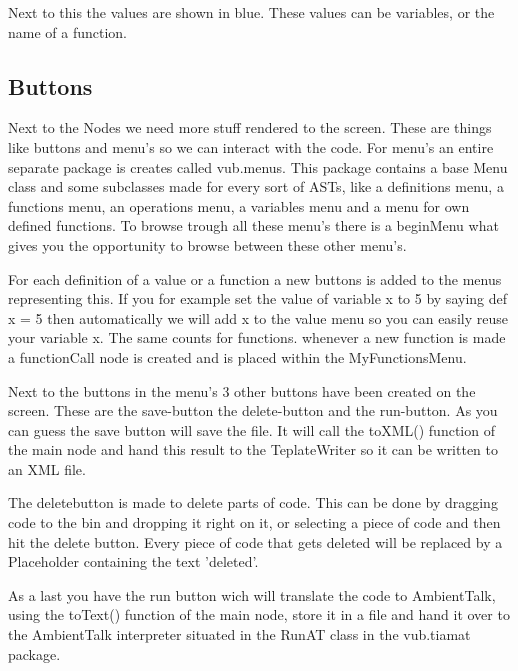 \documentclass[a4paper,12pt]{report}
\begin{document}
Next to this the values are shown in blue. These values can be variables, or the name of a function.

\subsection{Buttons}
Next to the Nodes we need more stuff rendered to the screen. These are things like buttons and menu's so we can interact with the code. For menu's an entire separate package is creates called vub.menus. This package contains a 
base Menu class and some subclasses made for every sort of ASTs, like a definitions menu, a functions menu, an operations menu, a variables menu and a menu for own defined functions. To browse trough all these menu's there is 
a beginMenu what gives you the opportunity to browse between these other menu's.

For each definition of a value or a function a new buttons is added to the menus representing this. If you for example set the value of variable x to 5 by saying def x = 5 then automatically we will add x to
the value menu so you can easily reuse your variable x. The same counts for functions. whenever a new function is made a functionCall node is created and is placed within the MyFunctionsMenu.

Next to the buttons in the menu's 3 other buttons have been created on the screen. These are the save-button the delete-button and the run-button. As you can guess the save button will save the file. It will call the 
toXML() function of the main node and hand this result to the TeplateWriter so it can be written to an XML file.

The deletebutton is made to delete parts of code. This can be done by dragging code to the bin and dropping it right on it, or selecting a piece of code and then hit the delete button. Every piece of code that gets 
deleted will be replaced by a Placeholder containing the text 'deleted'.

As a last you have the run button wich will translate the code to AmbientTalk, using the toText() function of the main node, store it in a file and hand it over to the AmbientTalk interpreter situated in the RunAT class in the 
vub.tiamat package.
\end{document}
